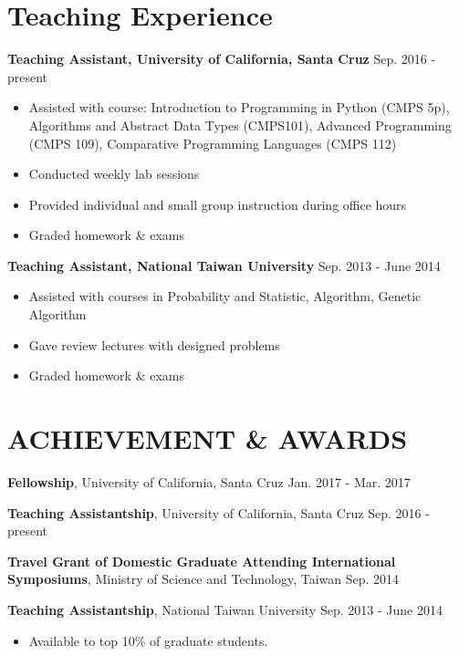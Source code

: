 \documentclass[a4paper,10pt]{article}
\begin{document}
\section{Teaching Experience}
\textbf{Teaching Assistant, University of California, Santa Cruz}  \hfill Sep. 2016 - present
    \begin{itemize}
        \item Assisted with course: Introduction to Programming in Python (CMPS 5p), Algorithms and Abstract Data Types (CMPS101), Advanced Programming (CMPS 109), Comparative Programming Languages (CMPS 112)
        \item Conducted weekly lab sessions
        \item Provided individual and small group instruction during office hours
        \item Graded homework \& exams
    \end{itemize}
\textbf{Teaching Assistant, National Taiwan University} \hfill Sep. 2013 - June 2014
    \begin{itemize}
        \item Assisted with courses in Probability and Statistic, Algorithm, Genetic Algorithm
        \item Gave review lectures with designed problems
        \item Graded homework \& exams
    \end{itemize}

\section{ACHIEVEMENT \& AWARDS}

\textbf{Fellowship}, University of California, Santa Cruz \hfill Jan. 2017 - Mar. 2017

\textbf{Teaching Assistantship}, University of California, Santa Cruz \hfill Sep. 2016 - present

\textbf{Travel Grant of Domestic Graduate Attending International Symposiums}, Ministry of Science and Technology, Taiwan \hfill Sep. 2014

\textbf{Teaching Assistantship}, National Taiwan University \hfill Sep. 2013 - June 2014
\begin{itemize}
    \item Available to top 10\% of graduate students.
\end{itemize}
\end{document}
